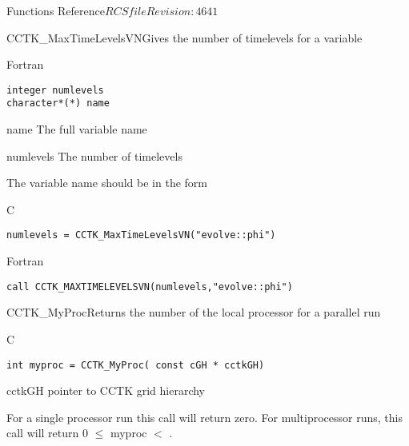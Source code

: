 \begin{cactuspart}{ Functions Reference}{$RCSfile$}{$Revision: 4641 $}
\begin{FunctionDescription}{CCTK\_MaxTimeLevelsVN}{Gives the number of timelevels for a variable}
\begin{SynopsisSection}
\begin{Synopsis}{Fortran}
\begin{verbatim}
integer numlevels
character*(*) name\end{verbatim}
\end{Synopsis}
\end{SynopsisSection}
\begin{ParameterSection}
\begin{Parameter}{name}
The full variable name
\end{Parameter}
\begin{Parameter}{numlevels}
The number of timelevels
\end{Parameter}
\end{ParameterSection}
\begin{Discussion}
The variable name should be in the form 
\end{Discussion}
\begin{ExampleSection}
\begin{Example}{C}
\begin{verbatim}
numlevels = CCTK_MaxTimeLevelsVN("evolve::phi")
\end{verbatim}
\end{Example}
\begin{Example}{Fortran}
\begin{verbatim}
call CCTK_MAXTIMELEVELSVN(numlevels,"evolve::phi")
\end{verbatim}
\end{Example}
\end{ExampleSection}
\end{FunctionDescription}

\begin{FunctionDescription}{CCTK\_MyProc}{Returns the number of the local processor for a parallel run}
\label{CCTK-MyProc}
\begin{SynopsisSection}
\begin{Synopsis}{C}
\begin{verbatim}int myproc = CCTK_MyProc( const cGH * cctkGH)\end{verbatim}
\end{Synopsis}
\end{SynopsisSection}
\begin{ParameterSection}
\begin{Parameter}{cctkGH}
pointer to CCTK grid hierarchy
\end{Parameter}
\end{ParameterSection}
\begin{Discussion}
For a single processor run this call will return zero. For multiprocessor
runs, this call will return 0 $\leq$ myproc $<$ .


\end{Discussion}
\end{FunctionDescription}
\end{cactuspart}
